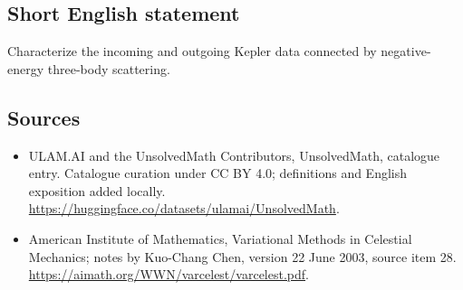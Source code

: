 \documentclass[11pt]{article}
\begin{document}
\subsection{Short English statement}
Characterize the incoming and outgoing Kepler data connected by negative-energy three-body scattering.
\subsection{Sources}
\begin{itemize}
\item[\hypertarget{source:statement:1}{S1}] ULAM.AI and the UnsolvedMath Contributors, UnsolvedMath, catalogue entry. Catalogue curation under CC BY 4.0; definitions and English exposition added locally.
\url{https://huggingface.co/datasets/ulamai/UnsolvedMath}.
\item[\hypertarget{source:statement:2}{S2}] American Institute of Mathematics, Variational Methods in Celestial Mechanics; notes by Kuo-Chang Chen, version 22 June 2003, source item 28.
\url{https://aimath.org/WWN/varcelest/varcelest.pdf}.
\end{itemize}
\label{end:statement}
\end{document}
